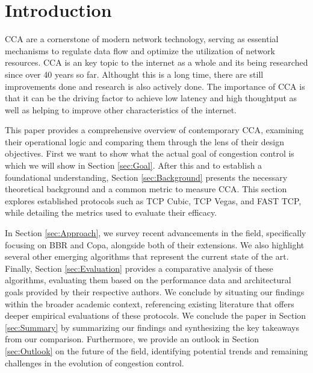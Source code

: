 \section{Introduction}

\ac{CCA} are a cornerstone of modern network technology, serving as essential mechanisms to regulate data flow and optimize the utilization of network resources. 
\ac{CCA} is an key topic to the internet as a whole and its being researched since over 40 years so far.
Althought this is a long time, there are still improvements done and research is also actively done.
The importance of \ac{CCA} is that it can be the driving factor to achieve low latency and high thoughtput as well as helping to improve other characteristics of the internet.

This paper provides a comprehensive overview of contemporary \acs{CCA}, examining their operational logic and comparing them through the lens of their design objectives.
First we want to show what the actual goal of congestion control is which we will show in Section \ref{sec:Goal}.
After this and to establish a foundational understanding, Section \ref{sec:Background} presents the necessary theoretical background and a common metric to measure \ac{CCA}. 
This section explores established protocols such as TCP Cubic, TCP Vegas, and FAST TCP, while detailing the metrics used to evaluate their efficacy.

In Section \ref{sec:Approach}, we survey recent advancements in the field, specifically focusing on \ac{BBR} and Copa, alongside both of their extensions. 
We also highlight several other emerging algorithms that represent the current state of the art.
Finally, Section \ref{sec:Evaluation} provides a comparative analysis of these algorithms, evaluating them based on the performance data and architectural goals provided by their respective authors. 
We conclude by situating our findings within the broader academic context, referencing existing literature that offers deeper empirical evaluations of these protocols.
We conclude the paper in Section \ref{sec:Summary} by summarizing our findings and synthesizing the key takeaways from our comparison. 
Furthermore, we provide an outlook in Section \ref{sec:Outlook} on the future of the field, identifying potential trends and remaining challenges in the evolution of congestion control.
